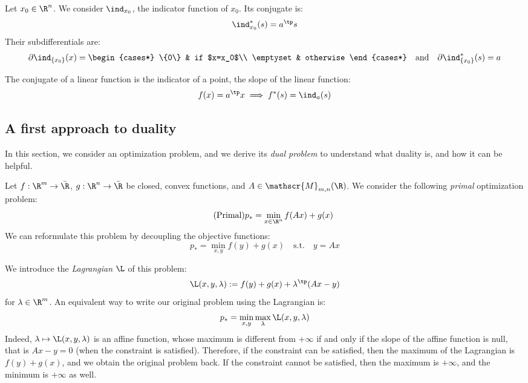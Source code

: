 \begin{example}
    Let $x_0\in\R^n$. We consider $\ind_{x_0}$, the indicator function of $x_0$. Its conjugate is:
    \begin{equation*}
        \ind_{x_0}^*(s) = a^\tp s
    \end{equation*}
    Their subdifferentials are:
    \begin{equation*}
        \partial\ind_{\{x_0\}}(x) = \begin{cases*}
            \{0\} & if $x=x_0$\\
            \emptyset & otherwise
        \end{cases*}
        \quad\text{and}\quad
        \partial\ind_{\{x_0\}}^*(s) = a
    \end{equation*}
\end{example}

\begin{example}
    The conjugate of a linear function is the indicator of a point, the slope of the linear function:
    \begin{equation*}
        f(x) = a^\tp x \implies f^*(s) = \ind_{a}(s)
    \end{equation*}
\end{example}

\subsection{A first approach to duality}
In this section, we consider an optimization problem, and we derive its \emph{dual problem} to understand what duality is, and how it can be helpful.

Let $f:\R^m\to\bar{\R}$, $g:\R^n\to\bar{\R}$ be closed, convex functions, and $A\in\mathscr{M}_{m, n}(\R)$. We consider the following \emph{primal} optimization problem:
\begin{equation}
    \label{eq:primal}
    \tag{Primal}
    p_* = \min_{x\in\R^n} f(Ax)+g(x)
\end{equation}
We can reformulate this problem by decoupling the objective functions:
\begin{equation*}
    p_* = \min_{x, y} f(y)+g(x) \quad\text{s.t.}\quad y=Ax
\end{equation*}

We introduce the \emph{Lagrangian} $\L$ of this problem:
\begin{equation}
    \L(x, y, \lambda) := f(y)+g(x)+\lambda^\tp(Ax-y)
\end{equation}
for $\lambda\in\R^m$. An equivalent way to write our original problem using the Lagrangian is:
\begin{equation*}
    p_* = \min_{x,y} \max_{\lambda} \L(x, y, \lambda)
\end{equation*}
Indeed, $\lambda\mapsto\L(x, y, \lambda)$ is an affine function, whose maximum is different from $+\infty$ if and only if the slope of the affine function is null, that is $Ax-y=0$ (when the constraint is satisfied). Therefore, if the constraint can be satisfied, then the maximum of the Lagrangian is $f(y)+g(x)$, and we obtain the original problem back. If the constraint cannot be satisfied, then the maximum is $+\infty$, and the minimum is $+\infty$ as well.

